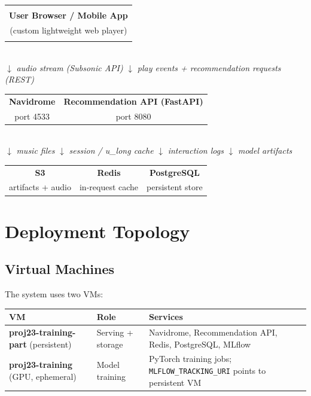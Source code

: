 \documentclass[11pt]{article}
\begin{document}
\begin{center}
\begin{tabular}{|c|}
\hline
\\
\textbf{User Browser / Mobile App} \\
\quad(custom lightweight web player) \\
\\
\hline
\end{tabular}
\\[4pt]
$\downarrow$ \textit{audio stream (Subsonic API)} \quad\quad
$\downarrow$ \textit{play events + recommendation requests (REST)}
\\[4pt]
\begin{tabular}{|c|c|}
\hline
\quad\textbf{Navidrome}\quad & \quad\textbf{Recommendation API (FastAPI)}\quad \\
port 4533 & port 8080 \\
\hline
\end{tabular}
\\[4pt]
$\downarrow$ \textit{music files} \qquad\qquad
$\downarrow$ \textit{session / u\_long cache}
\quad $\downarrow$ \textit{interaction logs}
\quad $\downarrow$ \textit{model artifacts}
\\[4pt]
\begin{tabular}{|c|c|c|}
\hline
\quad\textbf{S3}\quad & \quad\textbf{Redis}\quad & \quad\textbf{PostgreSQL}\quad \\
artifacts + audio & in-request cache & persistent store \\
\hline
\end{tabular}
\end{center}

\section{Deployment Topology}

\subsection{Virtual Machines}

The system uses two VMs:

\begin{longtable}{@{}llp{7cm}@{}}
\toprule
VM & Role & Services \\
\midrule
\textbf{proj23-training-part} (persistent) &
  Serving + storage &
  Navidrome, Recommendation API, Redis, PostgreSQL, MLflow \\[4pt]
\textbf{proj23-training} (GPU, ephemeral) &
  Model training &
  PyTorch training jobs; \texttt{MLFLOW\_TRACKING\_URI} points to persistent VM \\
\bottomrule
\end{longtable}
\end{document}
